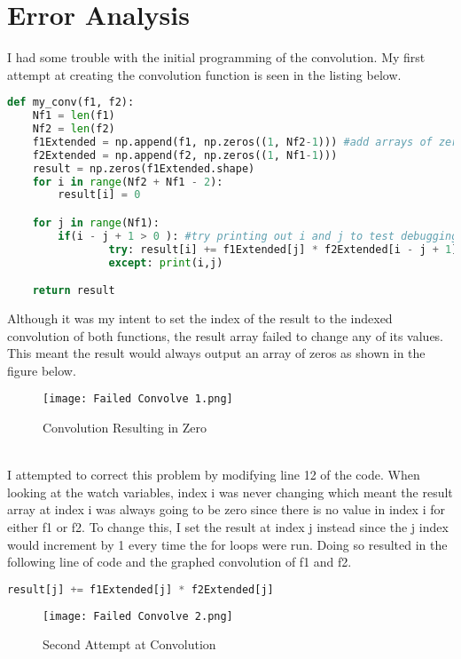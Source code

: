 \documentclass[12pt]{report}
\begin{document}
\section{Error Analysis}
\hspace{\parindent}I had some trouble with the initial programming of the convolution. My first attempt at creating the convolution function is seen in the listing below. 
\begin{lstlisting}[language=Python, caption=Convolution Function]
def my_conv(f1, f2):
    Nf1 = len(f1)
    Nf2 = len(f2)
    f1Extended = np.append(f1, np.zeros((1, Nf2-1))) #add arrays of zeros onto f1
    f2Extended = np.append(f2, np.zeros((1, Nf1-1)))
    result = np.zeros(f1Extended.shape)
    for i in range(Nf2 + Nf1 - 2):
        result[i] = 0

    for j in range(Nf1):
        if(i - j + 1 > 0 ): #try printing out i and j to test debugging
                try: result[i] += f1Extended[j] * f2Extended[i - j + 1]#try this
                except: print(i,j)

    return result
\end{lstlisting}
\hspace{\parindent}Although it was my intent to set the index of the result to the indexed convolution of both functions, the result array failed to change any of its values. This meant the result would always output an array of zeros as shown in the figure below.
\begin{figure}[h!]
    \centering
    \texttt{[image: Failed Convolve 1.png]}
    \caption{Convolution Resulting in Zero}
    \label{Figure x:}
\end{figure}
\\
\hspace{\parindent}I attempted to correct this problem by modifying line 12 of the code. When looking at the watch variables, index i was never changing which meant the result array at index i was always going to be zero since there is no value in index i for either f1 or f2. To change this, I set the result at index j instead since the j index would increment by 1 every time the for loops were run. Doing so resulted in the following line of code and the graphed convolution of f1 and f2.
\begin{lstlisting}[language=Python, caption=Modification of Line 12]
result[j] += f1Extended[j] * f2Extended[j]
\end{lstlisting}
\begin{figure}[h!]
    \centering
    \texttt{[image: Failed Convolve 2.png]}
    \caption{Second Attempt at Convolution}
    \label{Figure x:}
\end{figure}
\end{document}
